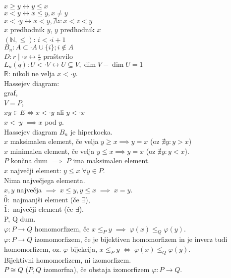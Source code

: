 \documentclass[a4paper, 12pt]{book}
\theoremstyle{definition}
\theoremstyle{remark}
\newcommand{\N}{\mathbb{N}}
\newcommand{\R}{\mathbb{R}}
\begin{document}
$x \geq y \leftrightarrow y \leq x$ \\
$x < y \leftrightarrow x \leq y, x \neq y$ \\
$x <\cdot y \leftrightarrow x < y, \nexists z: x < z < y$ \\
$x$ predhodnik $y$, $y$ predhodnik $x$ \\
$(\N, \leq)$: $i <\cdot i+1$ \\
$B_n: A \subset\cdot A \cup \{i\}; i \notin A$ \\
$D: r \mid\cdot s \leftrightarrow \frac{s}{r}$ praštevilo \\
$L_n(q): U <\cdot V \leftrightarrow U \subseteq V, \dim V - \dim U = 1$ \\
$\R$: nikoli ne velja $x <\cdot y$. \\
Hassejev diagram: \\
graf, \\
$V = P$, \\
$xy \in E \iff x <\cdot y$ ali $y <\cdot x$ \\
$x <\cdot y \; \implies x$ pod $y$. \\
Hassejev diagram $B_n$ je hiperkocka. \\
$x$ maksimalen element, če velja $y \geq x \implies y=x$ (oz $\nexists y: y > x$) \\
$x$ minimalen element, če velja $y \leq x \implies y=x$ (oz $\nexists y: y < x$). \\
$P$ končna dum $\implies$ $P$ ima maksimalen element. \\
$x$ največji element: $y \leq x \; \forall y \in P$. \\
Nima največjega elementa. \\
$x, y$ največja $\implies \; x \leq y, y \leq x \; \implies \; x = y$. \\
$\hat{0}:$ najmanjši element (če $\exists$), \\
$\hat{1}:$ največji element (če $\exists$). \\
P, Q dum. \\
$\varphi: P \to Q$ homomorfizem, če $x \leq_P y \; \implies \; \varphi(x) \leq_Q \varphi(y)$. \\
$\varphi: P \to Q$ izomomorfizem, če je bijektiven homomorfizem in je inverz tudi homomorfizem,
oz. $\varphi$ bijekcija, $x \leq_P y \; \iff \; \varphi(x) \leq_Q \varphi(y)$. \\
Bijektivni homomorfizem, ni izomorfizem. \\
$P \cong Q$ ($P,Q$ izomorfna), če obstaja izomorfizem $\varphi: P \to Q$. \\
\end{document}
